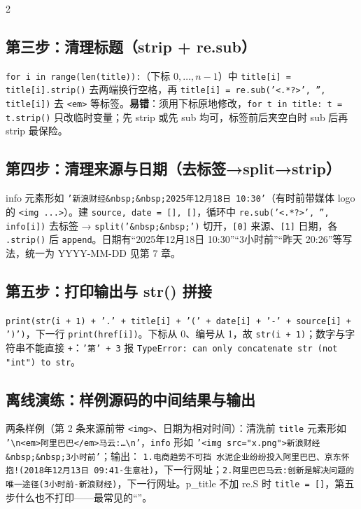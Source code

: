 \begin{multicols}{2}\raggedcolumns\sloppy
\subsection{第三步：清理标题（strip + re.sub）}
\texttt{for i in range(len(title)):}（下标 $0,\dots,n-1$）中 \texttt{title[i] = title[i].strip()} 去两端换行空格，再 \texttt{title[i] = re.sub('<.*?>', '', title[i])} 去 \texttt{<em>} 等标签。\textbf{易错}：须用下标原地修改，\texttt{for t in title: t = t.strip()} 只改临时变量；先 strip 或先 sub 均可，标签前后夹空白时 sub 后再 strip 最保险。

\subsection{第四步：清理来源与日期（去标签→split→strip）}
\begin{sloppypar}info 元素形如 \texttt{'新浪财经\&nbsp;\&nbsp;2025年12月18日 10:30'}（有时前带媒体 logo 的 \texttt{<img ...>}）。建 \texttt{source, date = [], []}，循环中 \texttt{re.sub('<.*?>', '', info[i])} 去标签 → \texttt{split('\&nbsp;\&nbsp;')} 切开，\texttt{[0]} 来源、\texttt{[1]} 日期，各 \texttt{.strip()} 后 \texttt{append}。日期有“2025年12月18日 10:30”“3小时前”“昨天 20:26”等写法，统一为 YYYY-MM-DD 见第 7 章。\end{sloppypar}

\subsection{第五步：打印输出与 str() 拼接}
\begin{sloppypar}\texttt{print(str(i + 1) + '.' + title[i] + '(' + date[i] + '-' + source[i] + ')')}，下一行 \texttt{print(href[i])}。下标从 0、编号从 1，故 \texttt{str(i + 1)}；数字与字符串不能直接 \texttt{+}：\texttt{'第' + 3} 报 \texttt{TypeError: can only concatenate str (not "int") to str}。\end{sloppypar}

\subsection{离线演练：样例源码的中间结果与输出}
两条样例（第 2 条来源前带 \texttt{<img>}、日期为相对时间）：清洗前 \texttt{title} 元素形如 \texttt{'\textbackslash n<em>阿里巴巴</em>马云:…\textbackslash n'}，\texttt{info} 形如 \texttt{'<img src="x.png">新浪财经\&nbsp;\&nbsp;3小时前'}；输出：
\texttt{1.电商趋势不可挡 水泥企业纷纷投入阿里巴巴、京东怀抱!(2018年12月13日 09:41-生意社)}，下一行网址；\texttt{2.阿里巴巴马云:创新是解决问题的唯一途径(3小时前-新浪财经)}，下一行网址。p\_title 不加 re.S 时 \texttt{title = []}，第五步什么也不打印——最常见的“”。


\end{multicols}
